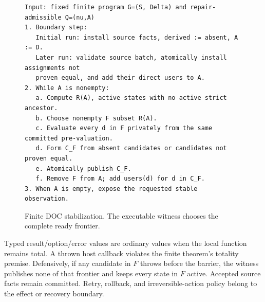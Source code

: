 \begin{figure}[t]
\centering
\begin{minipage}{.94\textwidth}\small
\begin{lstlisting}
Input: fixed finite program G=(S, Delta) and repair-admissible Q=(nu,A)
1. Boundary step:
   Initial run: install source facts, derived := absent, A := D.
   Later run: validate source batch, atomically install assignments not
   proven equal, and add their direct users to A.
2. While A is nonempty:
   a. Compute R(A), active states with no active strict ancestor.
   b. Choose nonempty F subset R(A).
   c. Evaluate every d in F privately from the same committed pre-valuation.
   d. Form C_F from absent candidates or candidates not proven equal.
   e. Atomically publish C_F.
   f. Remove F from A; add users(d) for d in C_F.
3. When A is empty, expose the requested stable observation.
\end{lstlisting}
\end{minipage}
\caption{Finite DOC stabilization. The executable witness chooses the complete ready frontier.}\label{alg:finite}
\end{figure}

\begin{boundary}
Typed result/option/error values are ordinary values when the local function remains total. A thrown host callback violates the finite theorem's totality premise. Defensively, if any candidate in $F$ throws before the barrier, the witness publishes none of that frontier and keeps every state in $F$ active. Accepted source facts remain committed. Retry, rollback, and irreversible-action policy belong to the effect or recovery boundary.
\end{boundary}

